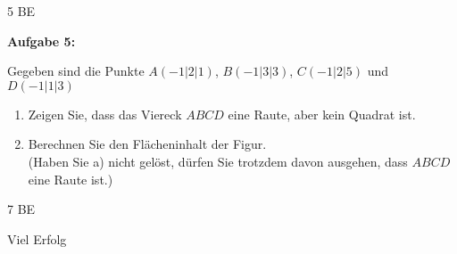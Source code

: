 \documentclass[a4paper,12pt]{article}
\newcommand{\Aufgabe}[1]{
  {
  \vspace*{0.5cm}
  \textsf{\textbf{Aufgabe #1}}
  \vspace*{0.2cm}
  
  }
}
\begin{document}
\begin{flushright}5 BE \end{flushright}
\newpage





\Aufgabe {5:} 

Gegeben sind die Punkte $A(-1|2|1)$, $B(-1|3|3)$, $C(-1|2|5)$ und $D(-1|1|3)$

\begin{enumerate}[label={\alph*)}]
  \item Zeigen Sie, dass das Viereck $ABCD$ eine Raute, aber kein Quadrat ist.
  \item Berechnen Sie den Flächeninhalt der Figur.\\
    {\scriptsize(Haben Sie a) nicht gelöst, dürfen Sie trotzdem davon ausgehen, dass $ABCD$ eine Raute ist.)}
\end{enumerate}

\begin{flushright} 7 BE \end{flushright}
\vspace{0,8cm}


\centerline{Viel Erfolg}









\end{document}
